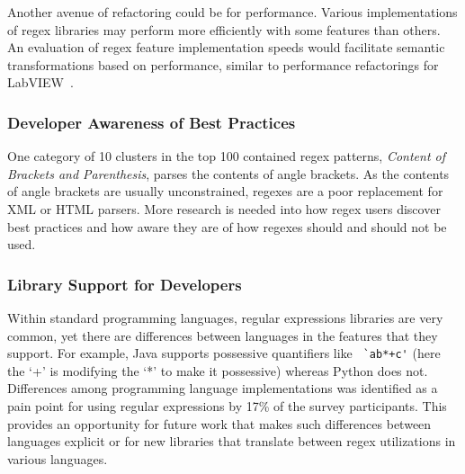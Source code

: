 Another avenue of refactoring could be for performance. Various implementations of regex libraries may perform more efficiently with some features than others. An evaluation of regex feature implementation speeds would facilitate semantic transformations based on performance, similar to performance refactorings for LabVIEW~\cite{chambers2013smell, chambers2015impact}.



\subsubsection{Developer Awareness of Best Practices}
One category of 10 clusters in the top 100 contained regex patterns, \emph{Content of Brackets and Parenthesis}, parses the contents of angle brackets.  As the contents of angle brackets are usually unconstrained, regexes are a poor replacement for XML or HTML parsers.  More research is needed into how regex users discover best practices and how aware they are of how regexes should and should not be used.

\subsubsection{Library Support for Developers}
Within standard programming languages, regular expressions libraries are very common, yet there are  differences between languages in the features that they support. For example, Java supports possessive quantifiers like \verb! `ab*+c'! (here the `+' is modifying the `*' to make it possessive) whereas Python does not. Differences among programming language implementations was identified as a pain point for using regular expressions by 17\% of the survey participants. This provides an opportunity for future work that makes such differences between languages explicit or for new libraries that translate between regex utilizations in various languages. 

